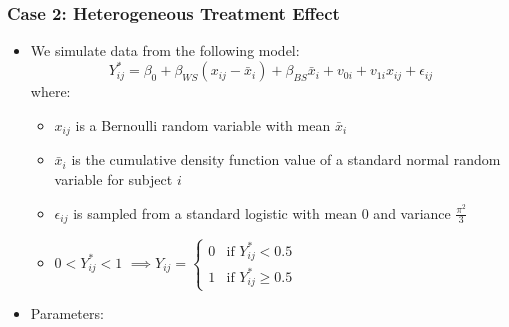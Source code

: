 \documentclass{article}
\begin{document}
        \subsubsection{Case 2: Heterogeneous Treatment Effect}
        \begin{itemize}
            \item We simulate data from the following model: $$Y_{ij}^* = \beta_0 + \beta_{WS}(x_{ij}-\bar{x}_i) + \beta_{BS}\bar{x}_i + v_{0i} + v_{1i}x_{ij} + \epsilon_{ij}$$
            where:
            \begin{itemize}
                \item $x_{ij}$ is a Bernoulli random variable with mean $\bar{x}_i$
                \item $\bar{x}_i$ is the cumulative density function value of a standard normal random variable for subject $i$
                                \item $\epsilon_{ij}$ is sampled from a standard logistic with mean 0 and variance $\frac{\pi^2}{3}$
                \item $ 0 < Y_{ij}^* < 1$   $\implies Y_{ij} = 
                    \begin{cases}
                        0 & \text{if } Y_{ij }^* < 0.5\\    
                        1 & \text{if } Y_{ij }^* \ge 0.5    
                    \end{cases}$
            \end{itemize}
            \item Parameters:
\end{itemize}
\end{document}
